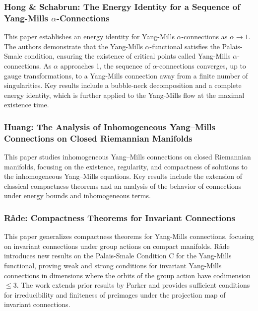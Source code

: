 \documentclass[10pt, letterpaper]{article}
\begin{document}
\subsubsection{Hong \& Schabrun: The Energy Identity for a Sequence of Yang-Mills \(\alpha\)-Connections \cite{hong2014energy}} 
This paper establishes an energy identity for Yang-Mills \(\alpha\)-connections as \(\alpha \to 1\). The authors demonstrate that the Yang-Mills \(\alpha\)-functional satisfies the Palais-Smale condition, ensuring the existence of critical points called Yang-Mills \(\alpha\)-connections. As \(\alpha\) approaches 1, the sequence of \(\alpha\)-connections converges, up to gauge transformations, to a Yang-Mills connection away from a finite number of singularities. Key results include a bubble-neck decomposition and a complete energy identity, which is further applied to the Yang-Mills flow at the maximal existence time.


\subsubsection{Huang: The Analysis of Inhomogeneous Yang–Mills Connections on Closed Riemannian Manifolds \cite{huang2020inhomogeneous}} 
This paper studies inhomogeneous Yang–Mills connections on closed Riemannian manifolds, focusing on the existence, regularity, and compactness of solutions to the inhomogeneous Yang–Mills equations. Key results include the extension of classical compactness theorems and an analysis of the behavior of connections under energy bounds and inhomogeneous terms.


\subsubsection{Råde: Compactness Theorems for Invariant Connections \cite{rade2000compactness}} 
This paper generalizes compactness theorems for Yang-Mills connections, focusing on invariant connections under group actions on compact manifolds. Råde introduces new results on the Palais-Smale Condition C for the Yang-Mills functional, proving weak and strong conditions for invariant Yang-Mills connections in dimensions where the orbits of the group action have codimension \(\leq 3\). The work extends prior results by Parker and provides sufficient conditions for irreducibility and finiteness of preimages under the projection map of invariant connections.



\vspace{1cm}
\end{document}
